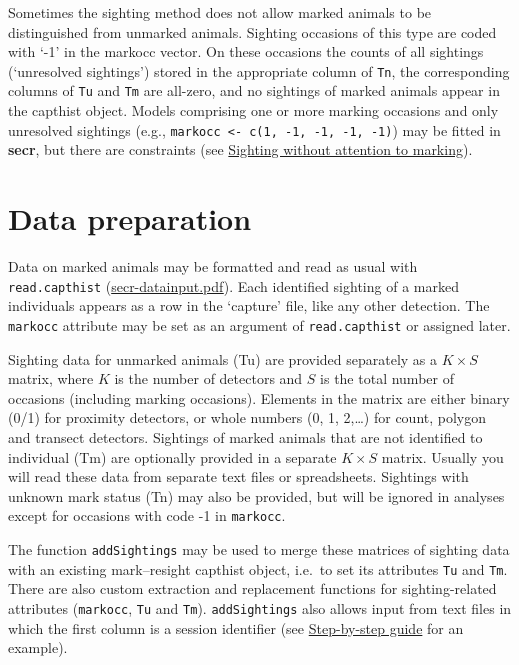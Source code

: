 \documentclass[
]{book}
\begin{document}
Sometimes the sighting method does not allow marked animals to be distinguished from unmarked animals. Sighting occasions of this type are coded with `-1' in the markocc vector. On these occasions the counts of all sightings (`unresolved sightings') stored in the appropriate column of \texttt{Tn}, the corresponding columns of \texttt{Tu} and \texttt{Tm} are all-zero, and no sightings of marked animals appear in the capthist object. Models comprising one or more marking occasions and only unresolved sightings (e.g., \texttt{markocc\ \textless{}-\ c(1,\ -1,\ -1,\ -1,\ -1)}) may be fitted in \textbf{secr}, but there are constraints (see \hyperref[appendix2]{Sighting without attention to marking}).

\section{Data preparation}\label{data-preparation}

Data on marked animals may be formatted and read as usual with \texttt{read.capthist} (\href{https://www.otago.ac.nz/density/pdfs/secr-datainput.pdf}{secr-datainput.pdf}). Each identified sighting of a marked individuals appears as a row in the `capture' file, like any other detection. The \texttt{markocc} attribute may be set as an argument of \texttt{read.capthist} or assigned later.

Sighting data for unmarked animals (Tu) are provided separately as a \(K \times S\) matrix, where \(K\) is the number of detectors and \(S\) is the total number of occasions (including marking occasions). Elements in the matrix are either binary (0/1) for proximity detectors, or whole numbers (0, 1, 2,\ldots) for count, polygon and transect detectors. Sightings of marked animals that are not identified to individual (Tm) are optionally provided in a separate \(K \times S\) matrix. Usually you will read these data from separate text files or spreadsheets. Sightings with unknown mark status (Tn) may also be provided, but will be ignored in analyses except for occasions with code -1 in \texttt{markocc}.

The function \texttt{addSightings} may be used to merge these matrices of sighting data with an existing mark--resight capthist object, i.e.~to set its attributes \texttt{Tu} and \texttt{Tm}. There are also custom extraction and replacement functions for sighting-related attributes (\texttt{markocc}, \texttt{Tu} and \texttt{Tm}). \texttt{addSightings} also allows input from text files in which the first column is a session identifier (see \hyperref[appendix1]{Step-by-step guide} for an example).
\end{document}
